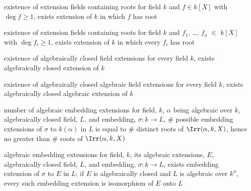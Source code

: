 \documentclass[17pt,landscape]{foils}
\begin{document}
{\begin{myproposition}{existence of extension fields containing roots}%
	for field $k$ and $f\in k[X]$ with $\deg f \geq 1$,
	exists extension of $k$ in which $f$ has root
\end{myproposition}

\vfill
\begin{mycorollary}{existence of extension fields containing roots}%
	for field $k$ and $f_1$, \ldots, $f_n$ $\in$ $k[X]$ with $\deg f_i \geq 1$,
	exists extension of $k$ in which every $f_i$ has root
\end{mycorollary}

\vfill
\begin{mytheorem}{existence of algebraically closed field extensions}%
	for every field $k$,
	exists algebraically closed extension of $k$
\end{mytheorem}

\vfill
\begin{mycorollary}{existence of algebraically closed algebraic field extensions}%
	for every field $k$,
	exists algebraically closed algebraic extension of $k$
	\
\end{mycorollary}



\begin{myproposition}{number of algebraic embedding extensions}%
	for field, $k$,
	$\alpha$ being algebraic over $k$,
	algebraically closed field, $L$,
	and
	embedding, $\sigma:k\to L$,
	\# possible embedding extensions of $\sigma$ to $k(\alpha)$ in $L$
	is
	equal to \# distinct roots of $\Irr(\alpha,k,X)$,
	hence
	no greater than \# roots of $\Irr(\alpha,k,X)$\
\end{myproposition}

\begin{mytheorem}{algebraic embedding extensions}%
		\index{field!algebraic embedding extension}
	for field, $k$,
	its algebraic extensions, $E$,
	algebraically closed field, $L$,
	and
	embedding, $\sigma:k\to L$,
	exists embedding extension of $\sigma$ to $E$ in $L$;
	if $E$ is algebraically closed and $L$ is algebraic over $k^\sigma$,
	every such embedding extension is isomorphism of $E$ onto $L$
\end{mytheorem}

}
\end{document}

